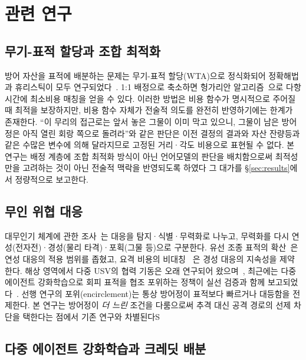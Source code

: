 \section{관련 연구}
\label{sec:related}

\subsection{무기-표적 할당과 조합 최적화}

방어 자산을 표적에 배분하는 문제는 무기-표적 할당(WTA)으로 정식화되어 정확해법과
휴리스틱이 모두 연구되었다~\citep{ahuja2007wta}. 1:1 배정으로 축소하면 헝가리안
알고리즘~\citep{kuhn1955hungarian}으로 다항 시간에 최소비용 매칭을 얻을 수 있다.
이러한 방법은 비용 함수가 명시적으로 주어질 때 최적을 보장하지만, 비용 함수 자체가 전술적
의도를 완전히 반영하기에는 한계가 존재한다. ``이 무리의 접근로는 앞서 놓은 그물이 이미 막고
있으니, 그물이 남은 방어정은 아직 열린 회랑 쪽으로 돌려라''와 같은 판단은 이전 결정의
결과와 자산 잔량등과 같은 수많은 변수에 의해 달라지므로 고정된 거리·각도 비용으로 표현될 수 없다.
본 연구는 배정 계층에 조합 최적화 방식이 아닌 언어모델의
판단을 배치함으로써 최적성만을 고려하는 것이 아닌 전술적 맥락을
반영되도록 하였다 그 대가를 \S\ref{sec:results}에서 정량적으로 보고한다.

\subsection{무인 위협 대응}

대무인기 체계에 관한 조사~\citep{wang2021cuas}는 대응을 탐지·식별·무력화로 나누고,
무력화를 다시 연성(전자전)·경성(물리 타격)·포획(그물 등)으로 구분한다. 유선 조종 표적의
확산~\citep{sutea2026fiber}은 연성 대응의 적용 범위를 좁혔고, 요격 비용의 비대칭
~\citep{rumbaugh2024cost}은 경성 대응의 지속성을 제약한다. 해상 영역에서 다중 USV의 협력
기동은 오래 연구되어 왔으며~\citep{liu2016usv}, 최근에는 다중 에이전트 강화학습으로 회피
표적을 협조 포위하는 정책이 실선 검증과 함께 보고되었다~\citep{zhang2025encircle}. 선행 연구의 포위(encirclement)는 통상 방어정이 표적보다 빠르거나
대등함을 전제한다. 본 연구는 방어정이 \emph{더 느린} 조건을 다룸으로써 추격 대신 공격
경로의 선제 차단을 택한다는 점에서 기존 연구와 차별된다S


\subsection{다중 에이전트 강화학습과 크레딧 배분}

